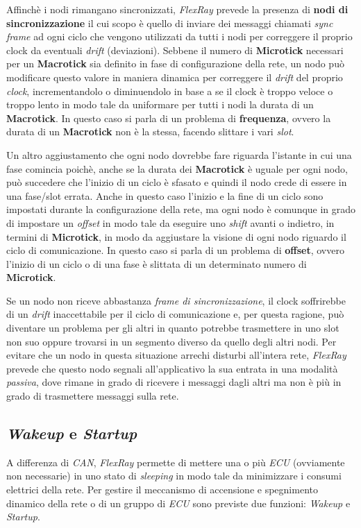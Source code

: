 Affinchè i nodi rimangano sincronizzati, \emph{FlexRay} prevede la presenza di \textbf{nodi di sincronizzazione} il cui scopo è quello di inviare dei messaggi chiamati \emph{sync frame} ad ogni ciclo che vengono utilizzati da tutti i nodi per correggere il proprio clock da eventuali \emph{drift} (deviazioni). Sebbene il numero di \textbf{Microtick} necessari per un \textbf{Macrotick} sia definito in fase di configurazione della rete, un nodo può modificare questo valore in maniera dinamica per correggere il \emph{drift} del proprio \emph{clock}, incrementandolo o diminuendolo in base a se il clock è troppo veloce o troppo lento \cite{eos_flexray} in modo tale da uniformare per tutti i nodi la durata di un \textbf{Macrotick}. In questo caso si parla di un problema di \textbf{frequenza}, ovvero la durata di un \textbf{Macrotick} non è la stessa, facendo slittare i vari \emph{slot}. \cite{flexray_specification} \cite{nxp_flexray}

Un altro aggiustamento che ogni nodo dovrebbe fare riguarda l'istante in cui una fase comincia poichè, anche se la durata dei \textbf{Macrotick} è uguale per ogni nodo, può succedere che l'inizio di un ciclo è sfasato e quindi il nodo crede di essere in una fase/slot errata. Anche in questo caso l'inizio e la fine di un ciclo sono impostati durante la configurazione della rete, ma ogni nodo è comunque in grado di impostare un \emph{offset} in modo tale da eseguire uno \emph{shift} avanti o indietro, in termini di \textbf{Microtick}, in modo da aggiustare la visione di ogni nodo riguardo il ciclo di comunicazione. In questo caso si parla di un problema di \textbf{offset}, ovvero l'inizio di un ciclo o di una fase è slittata di un determinato numero di \textbf{Microtick}. \cite{flexray_specification} \cite{nxp_flexray}

Se un nodo non riceve abbastanza \emph{frame di sincronizzazione}, il clock soffrirebbe di un \emph{drift} inaccettabile per il ciclo di comunicazione e, per questa ragione, può diventare un problema per gli altri in quanto potrebbe trasmettere in uno slot non suo oppure trovarsi in un segmento diverso da quello degli altri nodi. Per evitare che un nodo in questa situazione arrechi disturbi all'intera rete, \emph{FlexRay} prevede che questo nodo segnali all'applicativo la sua entrata in una modalità \emph{passiva}, dove rimane in grado di ricevere i messaggi dagli altri ma non è più in grado di trasmettere messaggi sulla rete. \cite{eos_flexray}

\subsection{\emph{Wakeup} e \emph{Startup}}
A differenza di \emph{CAN}, \emph{FlexRay} permette di mettere una o più \emph{ECU} (ovviamente non necessarie) in uno stato di \emph{sleeping} in modo tale da minimizzare i consumi elettrici della rete. Per gestire il meccanismo di accensione e spegnimento dinamico della rete o di un gruppo di \emph{ECU} sono previste due funzioni: \emph{Wakeup} e \emph{Startup}.

